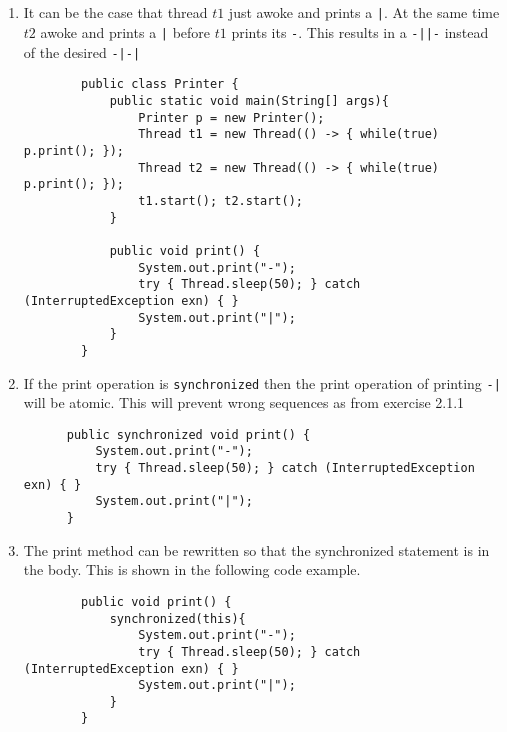 \documentclass{tufte-handout}
\begin{document}
  \subsection {}

  \begin{enumerate}
    \item It can be the case that thread $t1$ just awoke and prints a \texttt{|}. At the same time $t2$ awoke and prints a \texttt{|} before $t1$ prints its \texttt{-}. This results in a \texttt{-||-} instead of the desired \texttt{-|-|}

    \begin{fullwidth}
      \begin{lstlisting}
        public class Printer {
            public static void main(String[] args){
                Printer p = new Printer();
                Thread t1 = new Thread(() -> { while(true) p.print(); });
                Thread t2 = new Thread(() -> { while(true) p.print(); });
                t1.start(); t2.start();
            }

            public void print() {
                System.out.print("-");
                try { Thread.sleep(50); } catch (InterruptedException exn) { }
                System.out.print("|");        
            }
        }
      \end{lstlisting}
    \end{fullwidth}

    \item If the print operation is \texttt{synchronized} then the print operation of printing \texttt{-|} will be atomic. This will prevent wrong sequences as from exercise 2.1.1

    \begin{lstlisting}
      public synchronized void print() {
          System.out.print("-");
          try { Thread.sleep(50); } catch (InterruptedException exn) { }
          System.out.print("|");
      }
    \end{lstlisting}
  

    \item The print method can be rewritten so that the synchronized statement is in the body. This is shown in the following code example.

    \begin{fullwidth}
      \begin{lstlisting}
        public void print() {
            synchronized(this){
                System.out.print("-");
                try { Thread.sleep(50); } catch (InterruptedException exn) { }
                System.out.print("|");
            }
        }
      \end{lstlisting}
    \end{fullwidth}


\end{enumerate}
\end{document}
